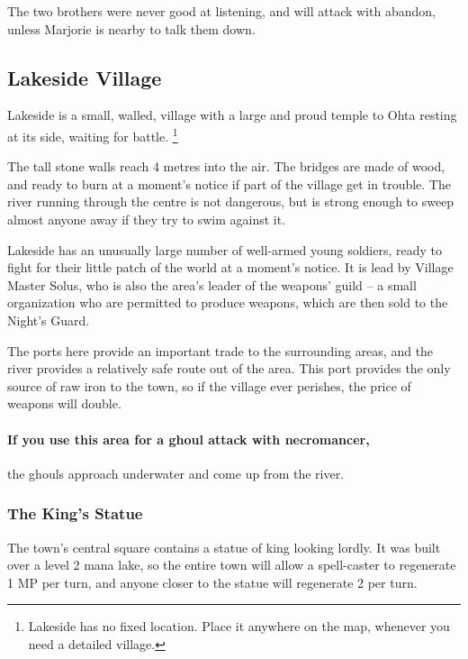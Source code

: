 \begin{multicols}{2}

The two brothers were never good at listening, and will attack with abandon, unless Marjorie is nearby to talk them down.


\subsection{Lakeside Village}

Lakeside is a small, walled, village with a large and proud temple to Ohta resting at its side, waiting for battle.%
\footnote{Lakeside has no fixed location. Place it anywhere on the map, whenever you need a detailed village.}

The tall stone walls reach 4 metres into the air.
The bridges are made of wood, and ready to burn at a moment's notice if part of the village get in trouble.
The river running through the centre is not dangerous, but is strong enough to sweep almost anyone away if they try to swim against it.

Lakeside has an unusually large number of well-armed young soldiers, ready to fight for their little patch of the world at a moment's notice.
It is lead by Village Master Solus, who is also the area's leader of the weapons' guild -- a small organization who are permitted to produce weapons, which are then sold to the Night's Guard.

The ports here provide an important trade to the surrounding areas, and the river provides a relatively safe route out of the area.
This port provides the only  source of raw iron to the town, so if the village ever perishes, the price of weapons will double.

\paragraph{If you use this area for a ghoul attack with \gls{necromancer},}
the ghouls approach underwater and come up from the river.
\subsubsection{The King's Statue}

The town's central square contains a statue of \gls{king} looking lordly.
It was built over a level 2 mana lake, so the entire town will allow a spell-caster to regenerate 1 MP per turn, and anyone closer to the statue will regenerate 2 per turn.


\end{multicols}
